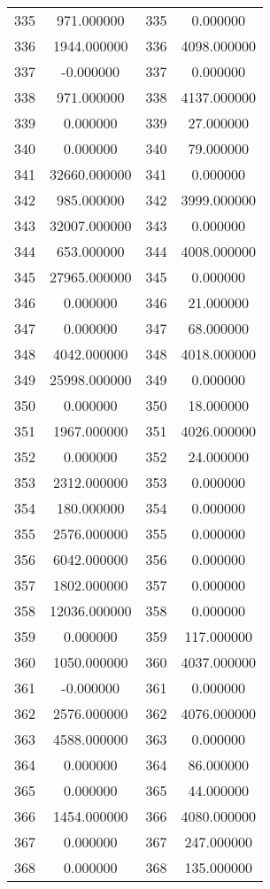 \documentclass[12pt]{article}
\begin{document}
\begin{longtable}{@{}cccc@{}}
335 & 971.000000 & 335 & 0.000000 \\
336 & 1944.000000 & 336 & 4098.000000 \\
337 & -0.000000 & 337 & 0.000000 \\
338 & 971.000000 & 338 & 4137.000000 \\
339 & 0.000000 & 339 & 27.000000 \\
340 & 0.000000 & 340 & 79.000000 \\
341 & 32660.000000 & 341 & 0.000000 \\
342 & 985.000000 & 342 & 3999.000000 \\
343 & 32007.000000 & 343 & 0.000000 \\
344 & 653.000000 & 344 & 4008.000000 \\
345 & 27965.000000 & 345 & 0.000000 \\
346 & 0.000000 & 346 & 21.000000 \\
347 & 0.000000 & 347 & 68.000000 \\
348 & 4042.000000 & 348 & 4018.000000 \\
349 & 25998.000000 & 349 & 0.000000 \\
350 & 0.000000 & 350 & 18.000000 \\
351 & 1967.000000 & 351 & 4026.000000 \\
352 & 0.000000 & 352 & 24.000000 \\
353 & 2312.000000 & 353 & 0.000000 \\
354 & 180.000000 & 354 & 0.000000 \\
355 & 2576.000000 & 355 & 0.000000 \\
356 & 6042.000000 & 356 & 0.000000 \\
357 & 1802.000000 & 357 & 0.000000 \\
358 & 12036.000000 & 358 & 0.000000 \\
359 & 0.000000 & 359 & 117.000000 \\
360 & 1050.000000 & 360 & 4037.000000 \\
361 & -0.000000 & 361 & 0.000000 \\
362 & 2576.000000 & 362 & 4076.000000 \\
363 & 4588.000000 & 363 & 0.000000 \\
364 & 0.000000 & 364 & 86.000000 \\
365 & 0.000000 & 365 & 44.000000 \\
366 & 1454.000000 & 366 & 4080.000000 \\
367 & 0.000000 & 367 & 247.000000 \\
368 & 0.000000 & 368 & 135.000000 \\

\end{longtable}
\end{document}
